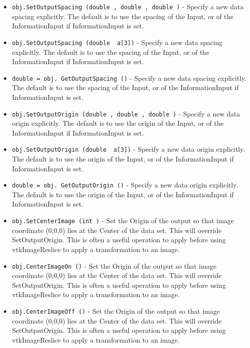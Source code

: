 \begin{itemize}
\item  \verb|obj.SetOutputSpacing (double , double , double )| -  Specify a new data spacing explicitly.  The default is to
 use the spacing of the Input, or of the InformationInput
 if InformationInput is set.

\item  \verb|obj.SetOutputSpacing (double  a[3])| -  Specify a new data spacing explicitly.  The default is to
 use the spacing of the Input, or of the InformationInput
 if InformationInput is set.

\item  \verb|double = obj. GetOutputSpacing ()| -  Specify a new data spacing explicitly.  The default is to
 use the spacing of the Input, or of the InformationInput
 if InformationInput is set.

\item  \verb|obj.SetOutputOrigin (double , double , double )| -  Specify a new data origin explicitly.  The default is to
 use the origin of the Input, or of the InformationInput
 if InformationInput is set.

\item  \verb|obj.SetOutputOrigin (double  a[3])| -  Specify a new data origin explicitly.  The default is to
 use the origin of the Input, or of the InformationInput
 if InformationInput is set.

\item  \verb|double = obj. GetOutputOrigin ()| -  Specify a new data origin explicitly.  The default is to
 use the origin of the Input, or of the InformationInput
 if InformationInput is set.

\item  \verb|obj.SetCenterImage (int )| -  Set the Origin of the output so that image coordinate (0,0,0)
 lies at the Center of the data set.  This will override 
 SetOutputOrigin.  This is often a useful operation to apply 
 before using vtkImageReslice to apply a transformation to an image. 

\item  \verb|obj.CenterImageOn ()| -  Set the Origin of the output so that image coordinate (0,0,0)
 lies at the Center of the data set.  This will override 
 SetOutputOrigin.  This is often a useful operation to apply 
 before using vtkImageReslice to apply a transformation to an image. 

\item  \verb|obj.CenterImageOff ()| -  Set the Origin of the output so that image coordinate (0,0,0)
 lies at the Center of the data set.  This will override 
 SetOutputOrigin.  This is often a useful operation to apply 
 before using vtkImageReslice to apply a transformation to an image. 


\end{itemize}
